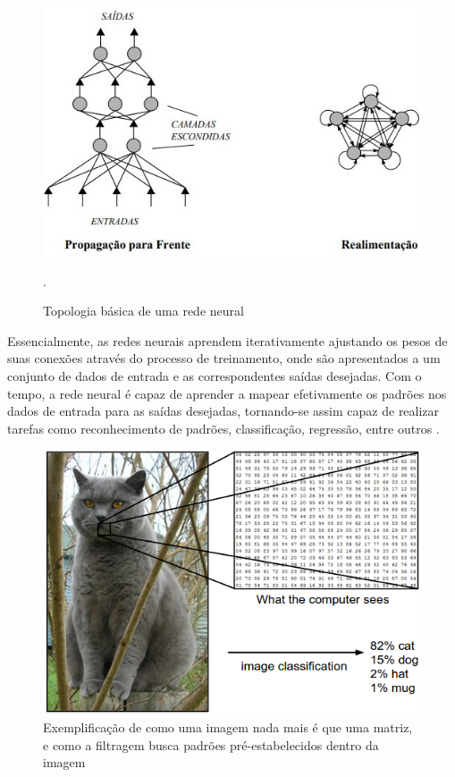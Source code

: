   \begin{figure}[!h]
      \centering
      \begin{minipage}{0.9\linewidth}
      \centering
      \captionsetup{justification=centering,margin=0.5cm,font=small}
      \includegraphics[width=0.7\linewidth]{img/cap2/topologia-rede.jpeg}
      \caption{Topologia básica de uma rede neural \cite{fleck2016redes}}.
      \label{fig:topologia}
      \end{minipage}
  \end{figure}  

Essencialmente, as redes neurais aprendem iterativamente ajustando os pesos de suas conexões através do processo de treinamento, onde são apresentados a um conjunto de dados de entrada e as correspondentes saídas desejadas. Com o tempo, a rede neural é capaz de aprender a mapear efetivamente os padrões nos dados de entrada para as saídas desejadas, tornando-se assim capaz de realizar tarefas como reconhecimento de padrões, classificação, regressão, entre outros \cite{haykin2001redes}.

\begin{figure}[!h]
    \center
    \begin{minipage}{0.9\linewidth}
    \center
    \captionsetup{justification=centering,margin=0.5cm,font=small}
    \includegraphics[width=0.7\linewidth]{img/cap2/gato.png}
    \caption{ Exemplificação de como uma imagem nada mais é que uma matriz, e como a filtragem busca padrões pré-estabelecidos dentro da imagem \cite{lima2020captcha}} 
    \label{fig:gato}
    \end{minipage}
\end{figure}

